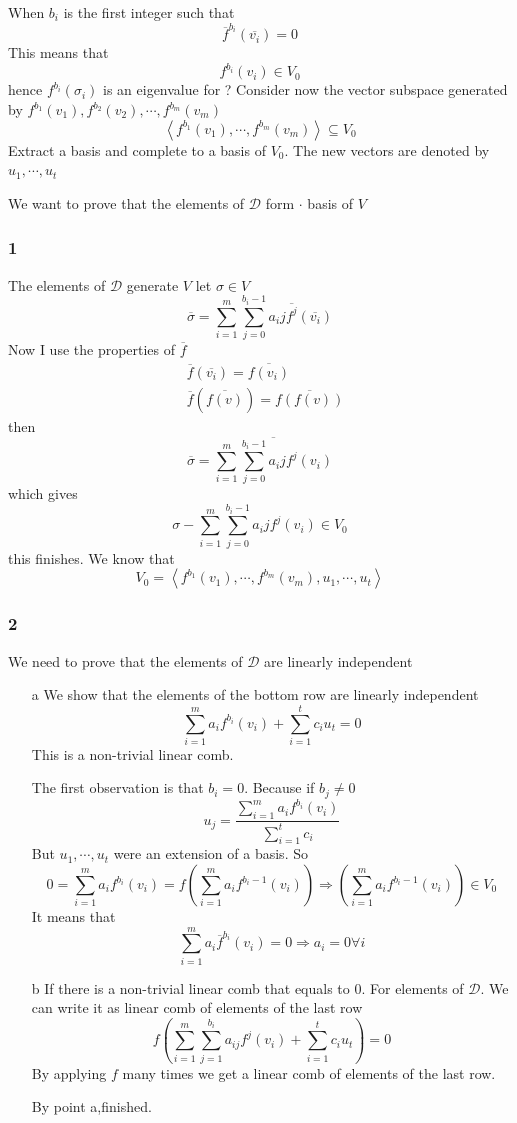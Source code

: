 \documentclass{book}
\begin{document}
When $b_i$ is the first integer such that $$\overline{f}^{b_i}(\overline{v_i})=0$$
This means that $$f^{b_i}(v_i)\in V_0$$ hence $f^{b_i}(\sigma_i)$ is an eigenvalue for ? Consider now the vector subspace generated by $f^{b_1}(v_1),f^{b_2}(v_2),\cdots,f^{b_m}(v_m)$$$\left<f^{b_1}(v_1),\cdots,f^{b_m}(v_m)\right>\subseteq V_0$$
Extract a basis and complete to a basis of $V_0$. The new vectors are denoted by $u_1,\cdots, u_t$

We want to prove that the elements of $\mathcal{D}$ form $\cdot$ basis of $V$
\subsubsection*{1}The elements of $\mathcal{D}$ generate $V$ let $\sigma\in V$$$\overline{\sigma}=\sum\limits_{i=1}^m\sum\limits_{j=0}^{b_i-1}a_ij\overline{f^j}(\overline{v_i})$$
Now I use the properties of $\overline{f}$$$\begin{aligned}
    &\overline{f}(\overline{v_i})=\overline{f(v_i)}\\ &\overline{f}(\overline{f(v)})=\overline{f(f(v))}
\end{aligned}$$
then $$\overline{\sigma}=\overline{\sum\limits_{i=1}^m\sum\limits_{j=0}^{b_i-1}a_ij{f^j}({v_i})}$$
which gives
$$\sigma-\sum\limits_{i=1}^m\sum\limits_{j=0}^{b_i-1}a_ij{f^j}({v_i})\in V_0$$
this finishes. We know that
$$V_0=\left<f^{b_1}(v_1),\cdots,f^{b_m}(v_m),u_1,\cdots,u_t\right>$$
\subsubsection*{2}
We need to prove that the elements of $\mathcal{D}$ are linearly independent
\begin{itemize}
    \item [a] We show that the elements of the bottom row are linearly independent$$\sum\limits_{i=1}^ma_if^{b_i}(v_i)+\sum\limits_{i=1}^tc_iu_t=0$$
    This is a non-trivial linear comb.
    
    The first observation is that $b_i=0$. Because if $b_j\neq0$ $$u_j=\frac{\sum\limits_{i=1}^ma_if^{b_i}(v_i)}{\sum\limits_{i=1}^tc_i}$$ But $u_1,\cdots,u_t$ were an extension of a basis. So $$0=\sum\limits_{i=1}^ma_if^{b_i}(v_i)=f(\sum\limits_{i=1}^ma_if^{b_i-1}(v_i))\Rightarrow(\sum\limits_{i=1}^ma_if^{b_i-1}(v_i))\in V_0$$
    It means that
    $$\sum\limits_{i=1}^ma_i\overline{f}^{b_i}(v_i)=0\Rightarrow a_i=0\forall i$$
    \item [b] If there is a non-trivial linear comb that equals to 0. For elements of $\mathcal{D}$. We can write it as linear comb of elements of the last row
    $$f(\sum\limits_{i=1}^m\sum\limits_{j=1}^{b_i}a_{ij}f^j(v_i)+\sum\limits_{i=1}^tc_iu_t)=0$$
    By applying $f$ many times we get a linear comb of elements of the last row.

    By point a,finished.
\end{itemize}
\end{document}

